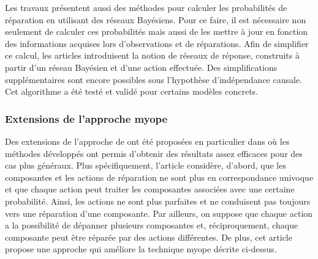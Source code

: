 \documentclass[a4paper,11pt]{article}
\theoremstyle{plain}
\begin{document}
Les travaux \cite{heckerman1994troubleshooting, Heckerman_1995} présentent aussi des méthodes pour calculer les probabilités de réparation en utilisant des réseaux Bayésiens. Pour ce faire, il est nécessaire non seulement de calculer ces probabilités mais aussi de les mettre à jour en fonction des informations acquises lors d'observations et de réparations. Afin de simplifier ce calcul, les articles introduisent la notion de réseaux de réponse, construits à partir d'un réseau Bayésien et d'une action effectuée. Des simplifications supplémentaires sont encore possibles sous l'hypothèse d'indépendance causale. Cet algorithme a été testé et validé pour certains modèles concrets.

%

\subsubsection{Extensions de l'approche myope}

Des extensions de l'approche de \cite{heckerman1994troubleshooting, Heckerman_1995} ont été proposées en particulier dans \cite{Jensen_2001, Langseth_2003} où les méthodes développés ont permis d'obtenir des résultats assez efficaces pour des cas plus généraux. Plus spécifiquement, l'article \cite{Jensen_2001} considère, d'abord, que les composantes et les actions de réparation ne sont plus en correspondance univoque et que chaque action peut traiter les composantes associées avec une certaine probabilité. Ainsi, les actions ne sont plus parfaites et ne conduisent pas toujours vers une réparation d'une composante. Par ailleurs, on suppose que chaque action a la possibilité de dépanner plusieurs composantes et, réciproquement, chaque composante peut être réparée par des actions différentes. De plus, cet article propose une approche qui améliore la technique myope décrite ci-dessus. %
\end{document}
